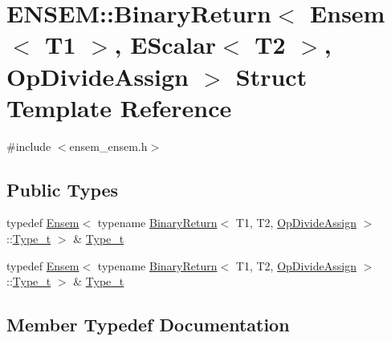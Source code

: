 \hypertarget{structENSEM_1_1BinaryReturn_3_01Ensem_3_01T1_01_4_00_01EScalar_3_01T2_01_4_00_01OpDivideAssign_01_4}{}\section{E\+N\+S\+EM\+:\+:Binary\+Return$<$ Ensem$<$ T1 $>$, E\+Scalar$<$ T2 $>$, Op\+Divide\+Assign $>$ Struct Template Reference}
\label{structENSEM_1_1BinaryReturn_3_01Ensem_3_01T1_01_4_00_01EScalar_3_01T2_01_4_00_01OpDivideAssign_01_4}


{\ttfamily \#include $<$ensem\+\_\+ensem.\+h$>$}

\subsection*{Public Types}
\begin{DoxyCompactItemize}
\item 
typedef \mbox{\hyperlink{classENSEM_1_1Ensem}{Ensem}}$<$ typename \mbox{\hyperlink{structENSEM_1_1BinaryReturn}{Binary\+Return}}$<$ T1, T2, \mbox{\hyperlink{structENSEM_1_1OpDivideAssign}{Op\+Divide\+Assign}} $>$\+::\mbox{\hyperlink{structENSEM_1_1BinaryReturn_3_01Ensem_3_01T1_01_4_00_01EScalar_3_01T2_01_4_00_01OpDivideAssign_01_4_aaecbcd931e5cb68f68b31ea753ac6d33}{Type\+\_\+t}} $>$ \& \mbox{\hyperlink{structENSEM_1_1BinaryReturn_3_01Ensem_3_01T1_01_4_00_01EScalar_3_01T2_01_4_00_01OpDivideAssign_01_4_aaecbcd931e5cb68f68b31ea753ac6d33}{Type\+\_\+t}}
\item 
typedef \mbox{\hyperlink{classENSEM_1_1Ensem}{Ensem}}$<$ typename \mbox{\hyperlink{structENSEM_1_1BinaryReturn}{Binary\+Return}}$<$ T1, T2, \mbox{\hyperlink{structENSEM_1_1OpDivideAssign}{Op\+Divide\+Assign}} $>$\+::\mbox{\hyperlink{structENSEM_1_1BinaryReturn_3_01Ensem_3_01T1_01_4_00_01EScalar_3_01T2_01_4_00_01OpDivideAssign_01_4_aaecbcd931e5cb68f68b31ea753ac6d33}{Type\+\_\+t}} $>$ \& \mbox{\hyperlink{structENSEM_1_1BinaryReturn_3_01Ensem_3_01T1_01_4_00_01EScalar_3_01T2_01_4_00_01OpDivideAssign_01_4_aaecbcd931e5cb68f68b31ea753ac6d33}{Type\+\_\+t}}
\end{DoxyCompactItemize}


\subsection{Member Typedef Documentation}
\mbox{\label{structENSEM_1_1BinaryReturn_3_01Ensem_3_01T1_01_4_00_01EScalar_3_01T2_01_4_00_01OpDivideAssign_01_4_aaecbcd931e5cb68f68b31ea753ac6d33}} 
